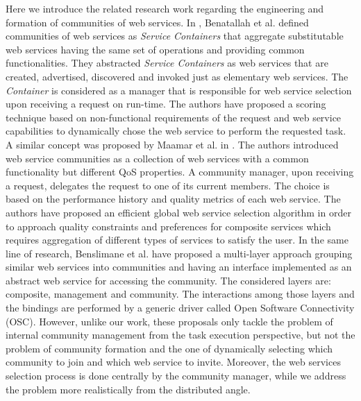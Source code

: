 \documentclass[11pt,onecolumn]{IEEEtran}
\begin{document}
{Here we introduce the related research work regarding the engineering and formation of communities of web services. In \cite{DBLP:journals/internet/BenatallahSD03}, Benatallah et al. defined communities of web services as \emph{Service Containers} that aggregate substitutable web services having the same set of operations and providing common functionalities. They abstracted \emph{Service Containers} as web services that are created, advertised, discovered and invoked just as elementary web services. The \emph{Container} is considered as a manager that is responsible for web service selection upon receiving a request on run-time. The authors have proposed a scoring technique based on non-functional requirements of the request and web service capabilities to dynamically chose the web service to perform the requested task. A similar concept was proposed by Maamar et al. in \cite{DBLP:journals/ijebr/MaamarSTBB09}. The authors introduced web service communities as a collection of web services with a common functionality but different QoS properties. A community manager, upon receiving a request, delegates the request to one of its current members. The choice is based on the performance history and quality metrics of each web service. The authors have proposed an efficient global web service selection algorithm in order to approach quality constraints and preferences for composite services which requires aggregation of different types of services to satisfy the user. In the same line of research, Benslimane et al. \cite{Liris-2770} have proposed a multi-layer approach grouping similar web services into communities and having an interface implemented as an abstract web service for accessing the community. The considered layers are: composite, management and community. The interactions among those layers and the bindings are performed by a generic driver called Open Software Connectivity (OSC). However, unlike our work, these proposals only tackle the problem of internal community management from the task execution perspective, but not the problem of community formation and the one of dynamically selecting which community to join and which web service to invite. Moreover, the web services selection process is done centrally by the community manager, while we address the problem more realistically from the distributed angle.

}
\end{document}
